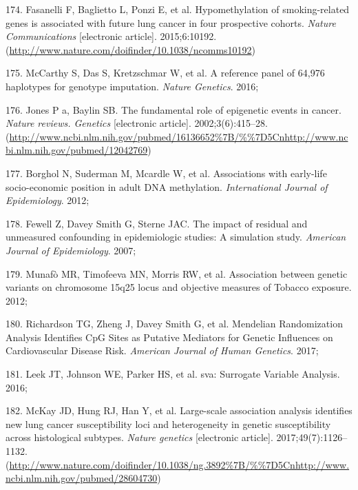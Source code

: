 \documentclass[11pt,oneside]{bristolthesis}
\newenvironment{cslreferences}%
  {}%
  {\par}
\begin{document}
\begin{cslreferences}
\leavevmode\hypertarget{ref-Fasanelli2015}{}%
174. Fasanelli F, Baglietto L, Ponzi E, et al. Hypomethylation of smoking-related genes is associated with future lung cancer in four prospective cohorts. \emph{Nature Communications} {[}electronic article{]}. 2015;6:10192. (\url{http://www.nature.com/doifinder/10.1038/ncomms10192})

\leavevmode\hypertarget{ref-McCarthy2016}{}%
175. McCarthy S, Das S, Kretzschmar W, et al. A reference panel of 64,976 haplotypes for genotype imputation. \emph{Nature Genetics}. 2016;

\leavevmode\hypertarget{ref-Jones2002}{}%
176. Jones P a, Baylin SB. The fundamental role of epigenetic events in cancer. \emph{Nature reviews. Genetics} {[}electronic article{]}. 2002;3(6):415--28. (\url{http://www.ncbi.nlm.nih.gov/pubmed/16136652\%7B/\%\%7D5Cnhttp://www.ncbi.nlm.nih.gov/pubmed/12042769})

\leavevmode\hypertarget{ref-Borghol2012}{}%
177. Borghol N, Suderman M, Mcardle W, et al. Associations with early-life socio-economic position in adult DNA methylation. \emph{International Journal of Epidemiology}. 2012;

\leavevmode\hypertarget{ref-Fewell2007}{}%
178. Fewell Z, Davey Smith G, Sterne JAC. The impact of residual and unmeasured confounding in epidemiologic studies: A simulation study. \emph{American Journal of Epidemiology}. 2007;

\leavevmode\hypertarget{ref-Munafo2012}{}%
179. Munafò MR, Timofeeva MN, Morris RW, et al. Association between genetic variants on chromosome 15q25 locus and objective measures of Tobacco exposure. 2012;

\leavevmode\hypertarget{ref-Richardson2017}{}%
180. Richardson TG, Zheng J, Davey Smith G, et al. Mendelian Randomization Analysis Identifies CpG Sites as Putative Mediators for Genetic Influences on Cardiovascular Disease Risk. \emph{American Journal of Human Genetics}. 2017;

\leavevmode\hypertarget{ref-Leek2016}{}%
181. Leek JT, Johnson WE, Parker HS, et al. sva: Surrogate Variable Analysis. 2016;

\leavevmode\hypertarget{ref-McKay2017}{}%
182. McKay JD, Hung RJ, Han Y, et al. Large-scale association analysis identifies new lung cancer susceptibility loci and heterogeneity in genetic susceptibility across histological subtypes. \emph{Nature genetics} {[}electronic article{]}. 2017;49(7):1126--1132. (\url{http://www.nature.com/doifinder/10.1038/ng.3892\%7B/\%\%7D5Cnhttp://www.ncbi.nlm.nih.gov/pubmed/28604730})


\end{cslreferences}
\end{document}
